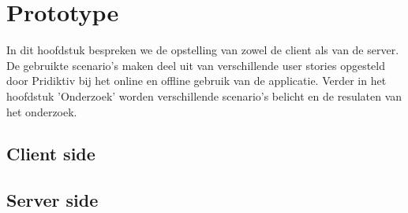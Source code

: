
\chapter{Prototype}
\label{ch:prototype}


In dit hoofdstuk bespreken we de opstelling van zowel de client als van de server. De gebruikte scenario's maken deel uit van verschillende user stories opgesteld door Pridiktiv bij het online en offline gebruik van de applicatie. Verder in het hoofdstuk 'Onderzoek' worden verschillende scenario's belicht en de resulaten van het onderzoek.

\section{Client side}
\section{Server side}